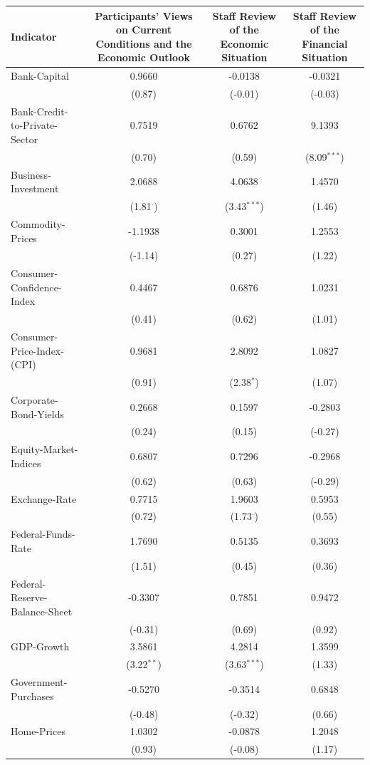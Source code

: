 \begin{tabular}{lccc}
\hline
Indicator & Participants' Views on Current Conditions and the Economic Outlook & Staff Review of the Economic Situation & Staff Review of the Financial Situation \\
\hline
Bank-Capital & 0.9660 & -0.0138 & -0.0321 \\
 & (0.87) & (-0.01) & (-0.03) \\
Bank-Credit-to-Private-Sector & 0.7519 & 0.6762 & 9.1393 \\
 & (0.70) & (0.59) & (8.09$^{***}$) \\
Business-Investment & 2.0688 & 4.0638 & 1.4570 \\
 & (1.81$^{\cdot}$) & (3.43$^{***}$) & (1.46) \\
Commodity-Prices & -1.1938 & 0.3001 & 1.2553 \\
 & (-1.14) & (0.27) & (1.22) \\
Consumer-Confidence-Index & 0.4467 & 0.6876 & 1.0231 \\
 & (0.41) & (0.62) & (1.01) \\
Consumer-Price-Index-(CPI) & 0.9681 & 2.8092 & 1.0827 \\
 & (0.91) & (2.38$^{*}$) & (1.07) \\
Corporate-Bond-Yields & 0.2668 & 0.1597 & -0.2803 \\
 & (0.24) & (0.15) & (-0.27) \\
Equity-Market-Indices & 0.6807 & 0.7296 & -0.2968 \\
 & (0.62) & (0.63) & (-0.29) \\
Exchange-Rate & 0.7715 & 1.9603 & 0.5953 \\
 & (0.72) & (1.73$^{\cdot}$) & (0.55) \\
Federal-Funds-Rate & 1.7690 & 0.5135 & 0.3693 \\
 & (1.51) & (0.45) & (0.36) \\
Federal-Reserve-Balance-Sheet & -0.3307 & 0.7851 & 0.9472 \\
 & (-0.31) & (0.69) & (0.92) \\
GDP-Growth & 3.5861 & 4.2814 & 1.3599 \\
 & (3.22$^{**}$) & (3.63$^{***}$) & (1.33) \\
Government-Purchases & -0.5270 & -0.3514 & 0.6848 \\
 & (-0.48) & (-0.32) & (0.66) \\
Home-Prices & 1.0302 & -0.0878 & 1.2048 \\
 & (0.93) & (-0.08) & (1.17) \\

\end{tabular}
